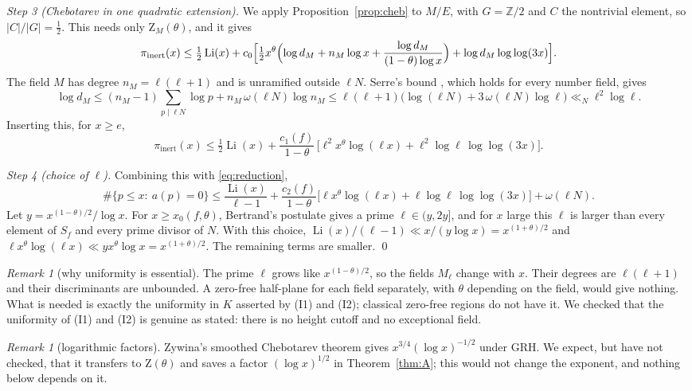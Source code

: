 \documentclass[11pt]{amsart}
\theoremstyle{definition}
\theoremstyle{remark}
\newtheorem{remark}[theorem]{Remark}
\newcommand{\Z}{\mathbb{Z}}
\DeclareMathOperator{\Li}{Li}
\newcommand{\Zt}{\mathrm{Z}}       %
\newcommand{\inert}{\mathrm{inert}}
\begin{document}
\emph{Step 3 (Chebotarev in one quadratic extension).} We apply Proposition~\ref{prop:cheb} to $M/E$, with
$G=\Z/2$ and $C$ the nontrivial element, so $|C|/|G|=\frac12$. This needs only $\Zt_M(\theta)$, and it gives
\[
  \pi_\inert(x)\le\tfrac12\Li(x)+c_0\Bigl[\tfrac12x^\theta\Bigl(\log d_M+n_M\log x+\frac{\log d_M}{(1-\theta)\log x}\Bigr)+\log d_M\log\log(3x)\Bigr].
\]
The field $M$ has degree $n_M=\ell(\ell+1)$ and is unramified outside $\ell N$. Serre's bound \cite[Prop.~6]{Serre81},
which holds for every number field, gives
\[
  \log d_M\le(n_M-1)\sum_{p\mid\ell N}\log p+n_M\,\omega(\ell N)\log n_M\le\ell(\ell+1)\bigl(\log(\ell N)+3\,\omega(\ell N)\log\ell\bigr)\ll_N\ell^2\log\ell .
\]
Inserting this, for $x\ge e$,
\[
  \pi_\inert(x)\le\tfrac12\Li(x)+\frac{c_1(f)}{1-\theta}\,\bigl[\ell^2x^\theta\log(\ell x)+\ell^2\log\ell\,\log\log(3x)\bigr].
\]

\emph{Step 4 (choice of $\ell$).} Combining this with \eqref{eq:reduction},
\[
  \#\{p\le x:\ a(p)=0\}\le\frac{\Li(x)}{\ell-1}+\frac{c_2(f)}{1-\theta}\bigl[\ell x^\theta\log(\ell x)+\ell\log\ell\,\log\log(3x)\bigr]+\omega(\ell N).
\]
Let $y=x^{(1-\theta)/2}/\log x$. For $x\ge x_0(f,\theta)$, Bertrand's postulate gives a prime $\ell\in(y,2y]$, and for
$x$ large this $\ell$ is larger than every element of $S_f$ and every prime divisor of $N$. With this choice,
$\Li(x)/(\ell-1)\ll x/(y\log x)=x^{(1+\theta)/2}$ and $\ell x^\theta\log(\ell x)\ll yx^\theta\log x=x^{(1+\theta)/2}$.
The remaining terms are smaller. \qed

\begin{remark}[why uniformity is essential]\label{rem:uniformity}
The prime $\ell$ grows like $x^{(1-\theta)/2}$, so the fields $M_\ell$ change with $x$. Their degrees are
$\ell(\ell+1)$ and their discriminants are unbounded. A zero-free half-plane for each field separately, with $\theta$
depending on the field, would give nothing. What is needed is exactly the uniformity in $K$ asserted by (I1) and (I2);
classical zero-free regions do not have it. We checked that the uniformity of (I1) and (I2) is genuine as stated:
there is no height cutoff and no exceptional field.
\end{remark}

\begin{remark}[logarithmic factors]\label{rem:smoothing}
Zywina's smoothed Chebotarev theorem \cite[Thms.~2.2--2.3]{Zyw15} gives $x^{3/4}(\log x)^{-1/2}$ under GRH. We expect,
but have not checked, that it transfers to $\Zt(\theta)$ and saves a factor $(\log x)^{1/2}$ in Theorem~\ref{thm:A};
this would not change the exponent, and nothing below depends on it.
\end{remark}
\end{document}

